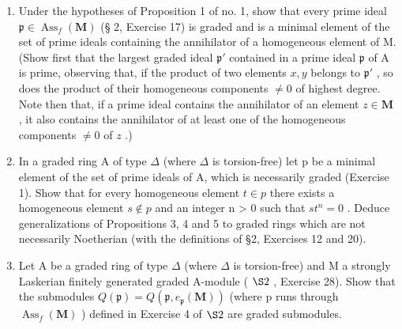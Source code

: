 
\begin{enumerate}
\def\labelenumi{\arabic{enumi}.}
\item
  Under the hypotheses of Proposition 1 of no. 1, show that every prime ideal \(\mathfrak{p} \in \operatorname{Ass}_f(\mathbf{M})\) (§ 2, Exercise 17) is graded and is a minimal element of the set of prime ideals containing the annihilator of a homogeneous element of M. (Show first that the largest graded ideal \(\mathfrak{p}'\) contained in a prime ideal \(\mathfrak{p}\) of A is prime, observing that, if the product of two elements \(x, y\) belongs to \(\mathfrak{p}'\) , so does the product of their homogeneous components \(\neq 0\) of highest degree. Note then that, if a prime ideal contains the annihilator of an element \(z \in \mathbf{M}\) , it also contains the annihilator of at least one of the homogeneous components \(\neq 0\) of \(z\) .)
\item
  In a graded ring A of type \(\Delta\) (where \(\Delta\) is torsion-free) let p be a minimal element of the set of prime ideals of A, which is necessarily graded (Exercise 1). Show that for every homogeneous element \(t \in p\) there exists a homogeneous element \(s \notin p\) and an integer n \textgreater{} 0 such that \(st^{n} = 0\) . Deduce generalizations of Propositions 3, 4 and 5 to graded rings which are not necessarily Noetherian (with the definitions of §2, Exercises 12 and 20).
\item
  Let A be a graded ring of type \(\Delta\) (where \(\Delta\) is torsion-free) and M a strongly Laskerian finitely generated graded A-module ( \(\S 2\) , Exercise 28). Show that the submodules \(Q(\mathfrak{p}) = Q(\mathfrak{p}, e_{\mathfrak{p}}(\mathbf{M}))\) (where p runs through \(\operatorname{Ass}_{f}(\mathbf{M})\) ) defined in Exercise 4 of \(\S 2\) are graded submodules.
\end{enumerate}

